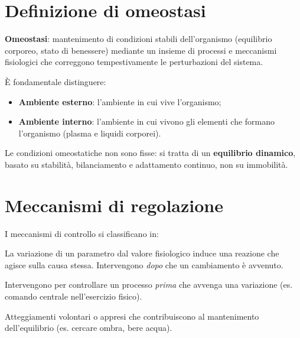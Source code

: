 \documentclass[11pt,a4paper,italian,twoside]{report}
\theoremstyle{definition} %
\begin{document}
\section{Definizione di omeostasi}
\label{sec:definizione}

\begin{definizione}
\textbf{Omeostasi}: mantenimento di condizioni stabili dell'organismo (equilibrio corporeo, stato di benessere) mediante un insieme di processi e meccanismi fisiologici che correggono tempestivamente le perturbazioni del sistema.
\end{definizione}

È fondamentale distinguere:
\begin{itemize}
  \item \textbf{Ambiente esterno}: l'ambiente in cui vive l'organismo;
  \item \textbf{Ambiente interno}: l'ambiente in cui vivono gli elementi che formano l'organismo (plasma e liquidi corporei).
\end{itemize}

\begin{concetto}
Le condizioni omeostatiche non sono fisse: si tratta di un \textbf{equilibrio dinamico}, basato su stabilità, bilanciamento e adattamento continuo, non su immobilità.
\end{concetto}

\section{Meccanismi di regolazione}
\label{sec:meccanismi}

I meccanismi di controllo si classificano in:

\begin{description}[leftmargin=1.5em,style=nextline]
  \item[Feedback (retroazione)] La variazione di un parametro dal valore fisiologico induce una reazione che agisce sulla causa stessa. Intervengono \textit{dopo} che un cambiamento è avvenuto.
  
  \item[Feedforward (anticipatorio)] Intervengono per controllare un processo \textit{prima} che avvenga una variazione (es. comando centrale nell'esercizio fisico).
  
  \item[Regolazioni comportamentali] Atteggiamenti volontari o appresi che contribuiscono al mantenimento dell'equilibrio (es. cercare ombra, bere acqua).
\end{description}
\end{document}
